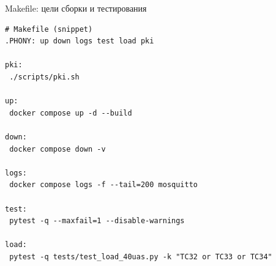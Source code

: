 \documentclass[aspectratio=169]{beamer}
\begin{document}
\begin{frame}{Makefile: цели сборки и тестирования}
\small
\begin{verbatim}
# Makefile (snippet)
.PHONY: up down logs test load pki

pki:
 ./scripts/pki.sh

up:
 docker compose up -d --build

down:
 docker compose down -v

logs:
 docker compose logs -f --tail=200 mosquitto

test:
 pytest -q --maxfail=1 --disable-warnings

load:
 pytest -q tests/test_load_40uas.py -k "TC32 or TC33 or TC34"
\end{verbatim}
\end{frame}
\end{document}
